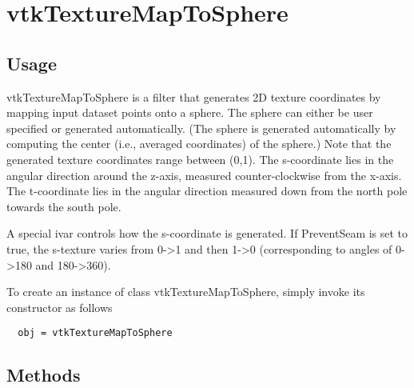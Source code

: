 \section{vtkTextureMapToSphere}

\subsection{Usage}

 vtkTextureMapToSphere is a filter that generates 2D texture coordinates by
 mapping input dataset points onto a sphere. The sphere can either be user
 specified or generated automatically. (The sphere is generated
 automatically by computing the center (i.e., averaged coordinates) of the
 sphere.)  Note that the generated texture coordinates range between
 (0,1). The s-coordinate lies in the angular direction around the z-axis,
 measured counter-clockwise from the x-axis. The t-coordinate lies in the
 angular direction measured down from the north pole towards the south
 pole.

 A special ivar controls how the s-coordinate is generated. If PreventSeam
 is set to true, the s-texture varies from 0->1 and then 1->0 (corresponding
 to angles of 0->180 and 180->360).

To create an instance of class vtkTextureMapToSphere, simply
invoke its constructor as follows
\begin{verbatim}
  obj = vtkTextureMapToSphere
\end{verbatim}
\subsection{Methods}

